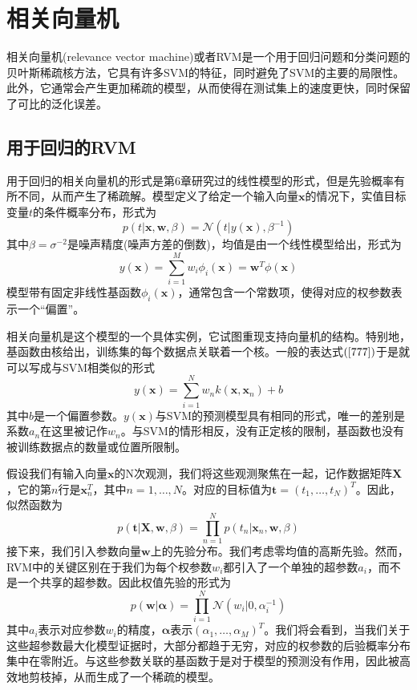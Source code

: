 \section{相关向量机}
相关向量机(relevance vector machine)或者RVM是一个用于回归问题和分类问题的贝叶斯稀疏核方法，它具有许多SVM的特征，同时避免了SVM的主要的局限性。此外，它通常会产生更加稀疏的模型，从而使得在测试集上的速度更快，同时保留了可比的泛化误差。
\subsection*{用于回归的RVM}
用于回归的相关向量机的形式是第6章研究过的线性模型的形式，但是先验概率有所不同，从而产生了稀疏解。模型定义了给定一个输入向量$\boldsymbol{x}$的情况下，实值目标变量$t$的条件概率分布，形式为
\begin{equation}
	p(t|\boldsymbol{x},\boldsymbol{w},\beta)=\mathcal{N}(t|y(\boldsymbol{x}),\beta^{-1})
\end{equation}
其中$\beta=\sigma^{-2}$是噪声精度(噪声方差的倒数)，均值是由一个线性模型给出，形式为
\begin{equation}
\label{777}
	y(\boldsymbol{x})=\sum_{i=1}^{M}w_i\phi_i(\boldsymbol{x})=\boldsymbol{w}^T\phi(\boldsymbol{x})
\end{equation}
模型带有固定非线性基函数$\phi_i(\boldsymbol{x})$，通常包含一个常数项，使得对应的权参数表示一个“偏置”。

相关向量机是这个模型的一个具体实例，它试图重现支持向量机的结构。特别地，基函数由核给出，训练集的每个数据点关联着一个核。一般的表达式$(\ref{777})$于是就可以写成与SVM相类似的形式
\begin{equation}
\label{778}
	y(\boldsymbol{x})=\sum_{i=1}^{N}w_nk(\boldsymbol{x},\boldsymbol{x}_n)+b
\end{equation}
其中$b$是一个偏置参数。$y(\boldsymbol{x})$与SVM的预测模型具有相同的形式，唯一的差别是系数$a_n$在这里被记作$w_n$。与SVM的情形相反，没有正定核的限制，基函数也没有被训练数据点的数量或位置所限制。

假设我们有输入向量$\boldsymbol{x}$的N次观测，我们将这些观测聚焦在一起，记作数据矩阵$\boldsymbol{X}$，它的第$n$行是$\boldsymbol{x}_n^T$，其中$n=1,\dots,N$。对应的目标值为$\boldsymbol{t}=(t_1,\dots,t_N)^T$。因此，似然函数为
\begin{equation}
	p(\boldsymbol{t}|\boldsymbol{X},\boldsymbol{w},\beta)=\prod_{n=1}^{N}p(t_n|\boldsymbol{x}_n,\boldsymbol{w},\beta)
\end{equation}
接下来，我们引入参数向量$\boldsymbol{w}$上的先验分布。我们考虑零均值的高斯先验。然而，RVM中的关键区别在于我们为每个权参数$w_i$都引入了一个单独的超参数$a_i$，而不是一个共享的超参数。因此权值先验的形式为
\begin{equation}
	p(\boldsymbol{w}|\boldsymbol{\alpha})=\prod_{i=1}^{N}\mathcal{N}(w_i|0,\alpha_i^{-1})
\end{equation}
其中$a_i$表示对应参数$w_i$的精度，$\boldsymbol{\alpha}$表示$(\alpha_1,\dots,\alpha_M)^T$。我们将会看到，当我们关于这些超参数最大化模型证据时，大部分都趋于无穷，对应的权参数的后验概率分布集中在零附近。与这些参数关联的基函数于是对于模型的预测没有作用，因此被高效地剪枝掉，从而生成了一个稀疏的模型。


